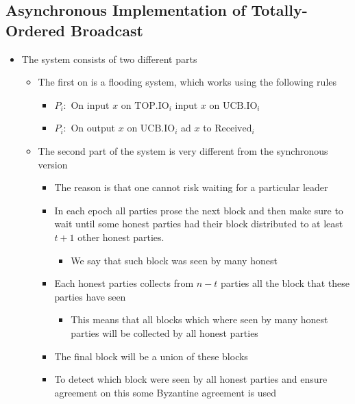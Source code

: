 \documentclass[11pt]{article}
\begin{document}
\subsection{Asynchronous Implementation of Totally-Ordered Broadcast}
\label{sec:org93f7b46}
\begin{itemize}
\item The system consists of two different parts
\begin{itemize}
\item The first on is a flooding system, which works using the following rules
\begin{itemize}
\item \(P_i:\) On input \(x\) on \(\text{TOP.IO}_i\) input \(x\) on \(\text{UCB.IO}_i\)
\item \(P_i:\) On output \(x\) on \(\text{UCB.IO}_i\) ad \(x\) to \(\text{Received}_i\)
\end{itemize}
\item The second part of the system is very different from the synchronous version
\begin{itemize}
\item The reason is that one cannot risk waiting for a particular leader
\item In each epoch all parties prose the next block and then make sure to wait until some honest parties had their block distributed to at least \(t+1\) other honest parties.
\begin{itemize}
\item We say that such block was seen by many honest
\end{itemize}
\item Each honest parties collects from \(n-t\) parties all the block that these parties have seen
\begin{itemize}
\item This means that all blocks which where seen by many honest parties will be collected by all honest parties
\end{itemize}
\item The final block will be a union of these blocks
\item To detect which block were seen by all honest parties and ensure agreement on this some Byzantine agreement is used
\end{itemize}
\end{itemize}
\end{itemize}
\end{document}
